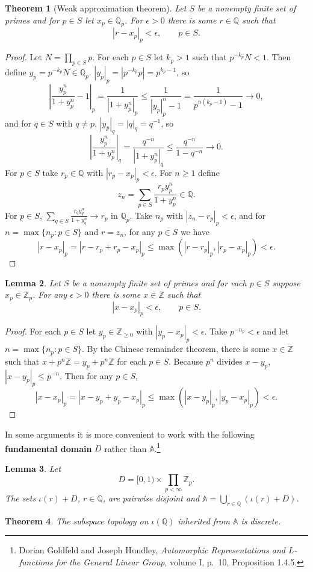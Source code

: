 \documentclass{article}
\newtheorem{theorem}{Theorem}
\newtheorem{lemma}[theorem]{Lemma}
\theoremstyle{definition}
\begin{document}
\begin{theorem}[Weak approximation theorem]
Let $S$ be a nonempty finite set of primes and for $p \in S$ let $x_p \in \mathbb{Q}_p$. 
For $\epsilon>0$ there is some $r \in \mathbb{Q}$ such that
\[
|r-x_p|_p < \epsilon,\qquad p \in S.
\]
\label{weakapproximation}
\end{theorem}
\begin{proof}
Let $N=\prod_{p \in S} p$. For  each
$p \in S$ let $k_p>1$ such that $p^{-k_p} N<1$. 
Then define $y_p = p^{-k_p} N \in \mathbb{Q}_p$. 
$|y_p|_p = |p^{-k_p} p|=p^{k_p-1}$, so
\[
\left|\frac{y_p^n}{1+y_p^n}-1\right|_p =\frac{1}{|1+y_p^n|_p} 
\leq \frac{1}{|y_p|_p^n-1} = \frac{1}{p^{n(k_p-1)} -1} \to 0,
\]
and for $q \in S$ with $q \neq p$,
$|y_p|_q = |q|_q = q^{-1}$, so
\[
\left| \frac{y_p^n}{1+y_p^n} \right|_q =
\frac{q^{-n}}{|1+y_p^n|_q}
\leq \frac{q^{-n}}{1-q^{-n}} \to 0.
\]
For $p \in S$ take $r_p \in \mathbb{Q}$ with $|r_p-x_p|_p<\epsilon$.
For $n \geq 1$ define
\[
z_n = \sum_{p \in S} \frac{r_p y_p^n}{1+y_p^n} \in \mathbb{Q}.
\]
For $p \in S$,  $\sum_{q \in S} \frac{r_qy_q^n}{1+y_q^n} \to r_p$  in $\mathbb{Q}_p$.
Take $n_p$ with $|z_n-r_p|_p < \epsilon$, and for $n=\max\{n_p : p \in S\}$ and $r=z_n$, for any
$p \in S$ we have
\[
|r-x_p|_p = |r-r_p+r_p-x_p|_p \leq \max(|r-r_p|_p,|r_p-x_p|_p) < \epsilon.
\] 
\end{proof}




\begin{lemma}
Let $S$ be a nonempty finite set of primes and for each $p \in S$ suppose $x_p \in \mathbb{Z}_p$. 
For any $\epsilon>0$ there is some $x \in \mathbb{Z}$ such that
\[
|x-x_p|_p<\epsilon,\qquad p \in S.
\]
\end{lemma}
\begin{proof}
For each $p \in S$ let $y_p \in \mathbb{Z}_{\geq 0}$ with $|y_p-x_p|_p<\epsilon$. Take
$p^{-n_p}<\epsilon$ and let $n=\max\{n_p: p \in S\}$. 
By the Chinese remainder theorem, there is some $x \in \mathbb{Z}$ such that
$x + p^n \mathbb{Z} = y_p + p^n \mathbb{Z}$ for each $p \in  S$. 
Because $p^n$ divides $x-y_p$, $|x-y_p|_p \leq p^{-n}$. 
Then for any $p \in S$,
\[
|x-x_p|_p = |x-y_p + y_p-x_p|_p \leq \max(|x-y_p|_p,|y_p-x_p|_p)
<\epsilon.
\]
\end{proof}


In some arguments it is more convenient to work with the following \textbf{fundamental
domain} $D$ rather than $\mathbb{A}$.\footnote{Dorian Goldfeld and Joseph Hundley,
{\em Automorphic Representations and $L$-functions for the General Linear Group}, volume I, p.~10, Proposition 1.4.5.}

\begin{lemma}
Let
\[
D = [0,1) \times \prod_{p<\infty} \mathbb{Z}_p.
\]
The sets $\iota(r)+D$, $r \in \mathbb{Q}$, are pairwise disjoint and $\mathbb{A} = \bigcup_{r \in \mathbb{Q}} (\iota(r)+D)$.
\end{lemma}




\begin{theorem}
The subspace topology on $\iota(\mathbb{Q})$ inherited from $\mathbb{A}$ is discrete.
\end{theorem}
\end{document}
